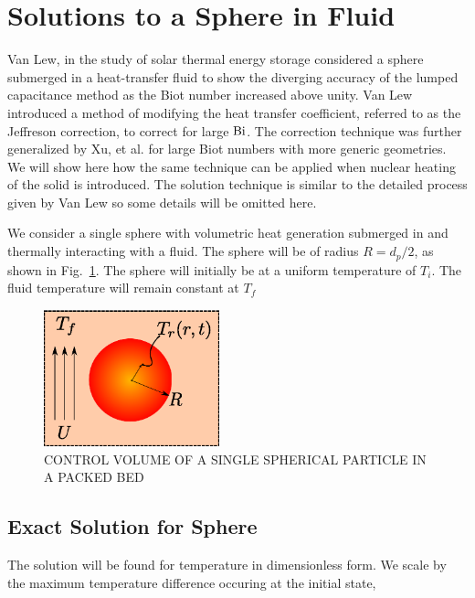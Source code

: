 
\section{Solutions to a Sphere in Fluid}
Van Lew\cite{VanLew2010}, in the study of solar thermal energy storage considered a sphere submerged in a heat-transfer fluid to show the diverging accuracy of the lumped capacitance method as the Biot number increased above unity. Van Lew introduced a method of modifying the heat transfer coefficient, referred to as the Jeffreson correction, to correct for large $\mathrm{Bi}$. The correction technique was further generalized by Xu, et al.\cite{Xu2012} for large Biot numbers with more generic geometries. We will show here how the same technique can be applied when nuclear heating of the solid is introduced. The solution technique is similar to the detailed process given by Van Lew\cite{VanLew2010} so some details will be omitted here.

We consider a single sphere with volumetric heat generation submerged in and thermally interacting with a fluid. The sphere will be of radius $R=d_p/2$, as shown in Fig.~\ref{fig:ParticleControlVolume}. The sphere will initially be at a uniform temperature of $T_i$. The fluid temperature will remain constant at $T_f$

\begin{figure}[ht]
	\centering
		\includegraphics[width=2in]{chapters/figures/ParticleControlVolume}
	\caption[Control volume of single spherical particle in a packed bed]{CONTROL VOLUME OF A SINGLE SPHERICAL PARTICLE IN A PACKED BED}
	\label{fig:ParticleControlVolume}
\end{figure}


\subsection{Exact Solution for Sphere}

The solution will be found for temperature in dimensionless form. We scale by the maximum temperature difference occuring at the initial state,

